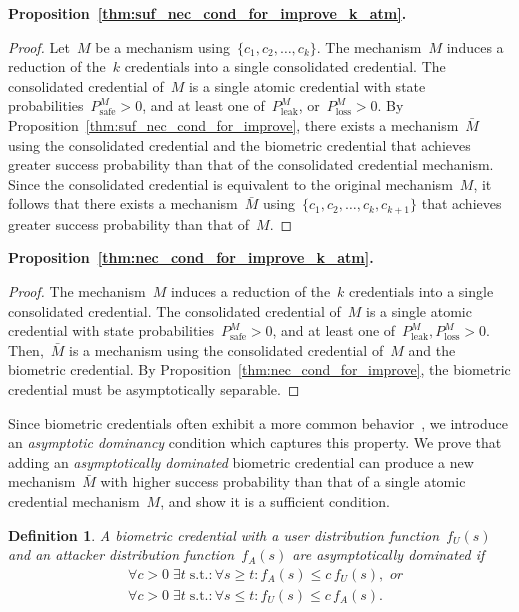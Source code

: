 \documentclass[conference,compsoc]{IEEEtran}
\newtheorem{definition}{Definition}
\begin{document}
\medskip
\noindent
\textbf{Proposition~\ref{thm:suf_nec_cond_for_improve_k_atm}.}
\begin{proof}
    Let~$M$ be a mechanism using~$\{c_1,c_2,\ldots,c_k\}$. The mechanism~$M$ induces a reduction of the~$k$ credentials into a single consolidated credential. The consolidated credential of~$M$ is a single atomic credential with state probabilities~$P^M_\text{safe}>0$, and at least one of~$P^M_\text{leak}$, or~$P^M_\text{loss} > 0$. By Proposition~\ref{thm:suf_nec_cond_for_improve}, there exists a mechanism~$\bar{M}$ using the consolidated credential and the biometric credential that achieves greater success probability than that of the consolidated credential mechanism. Since the consolidated credential is equivalent to the original mechanism~$M$, it follows that there exists a mechanism~$\bar{M}$ using~$\{c_1,c_2,\ldots,c_k,c_{k+1}\}$ that achieves greater success probability than that of~$M$.
\end{proof}

\medskip
\noindent
\textbf{Proposition~\ref{thm:nec_cond_for_improve_k_atm}.}
\begin{proof}
    The mechanism~$M$ induces a reduction of the~$k$ credentials into a single consolidated credential. The consolidated credential of~$M$ is a single atomic credential with state probabilities~$P^M_\text{safe}>0$, and at least one of~$P^M_\text{leak},P^M_\text{loss} > 0$. Then,~$\bar{M}$ is a mechanism using the consolidated credential of~$M$ and the biometric credential. By Proposition~\ref{thm:nec_cond_for_improve}, the biometric credential must be asymptotically separable.
\end{proof}

Since biometric credentials often exhibit a more common behavior~\cite{Slob2005,anil2004}, we introduce an \emph{asymptotic dominancy} condition which captures this property. We prove that adding an \emph{asymptotically dominated} biometric credential can produce a new mechanism~$\bar{M}$ with higher success probability than that of a single atomic credential mechanism~$M$, and show it is a sufficient condition.
\begin{definition}
\label{def:asym_dominance}
A biometric credential with a user distribution function~$f_U(s)$ and an attacker distribution function~$f_A(s)$ are \emph{asymptotically dominated} if
\begin{equation*}
\begin{aligned}
&\forall c>0\;\exists t\; \text{s.t.}:\forall s \ge t: f_A(s)\le c\,f_U(s),\textit{ or} \\
&\forall c>0\;\exists t\; \text{s.t.}:\forall s \le t: f_U(s)\le c\,f_A(s).
\end{aligned}
\end{equation*}
\end{definition}
\end{document}
